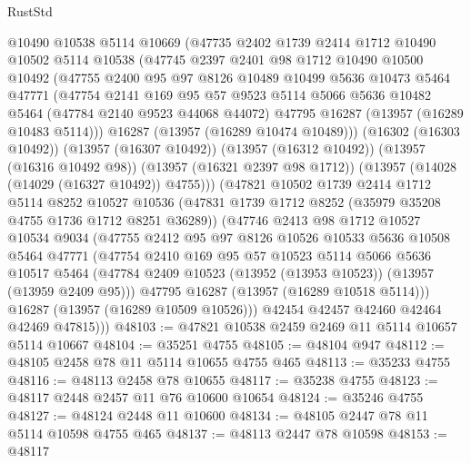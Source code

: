 \begin{lexlean}{RustStd}
\begin{coremodule}
    @10490
    @10538
    @5114
    @10669
    (@47735
      @2402
      @1739
      @2414
      @1712
      @10490
      @10502
      @5114
      @10538
      (@47745
        @2397
        @2401
        @98
        @1712
        @10490
        @10500
        @10492
        (@47755
          @2400
          @95
          @97
          @8126
          @10489
          @10499
          @5636
          @10473
          @5464
          @47771
          (@47754
            @2141
            @169
            @95
            @57
            @9523
            @5114
            @5066
            @5636
            @10482
            @5464
            (@47784 @2140 @9523 @44068 @44072)
            @47795
            @16287
            (@13957 (@16289 @10483 @5114)))
          @16287
          (@13957 (@16289 @10474 @10489)))
        (@16302 (@16303 @10492))
        (@13957 (@16307 @10492))
        (@13957 (@16312 @10492))
        (@13957 (@16316 @10492 @98))
        (@13957 (@16321 @2397 @98 @1712))
        (@13957 (@14028 (@14029 (@16327 @10492)) @4755)))
      (@47821
        @10502
        @1739
        @2414
        @1712
        @5114
        @8252
        @10527
        @10536
        (@47831 @1739 @1712 @8252 (@35979 @35208 @4755 @1736 @1712 @8251 @36289))
        (@47746
          @2413
          @98
          @1712
          @10527
          @10534
          @9034
          (@47755
            @2412
            @95
            @97
            @8126
            @10526
            @10533
            @5636
            @10508
            @5464
            @47771
            (@47754
              @2410
              @169
              @95
              @57
              @10523
              @5114
              @5066
              @5636
              @10517
              @5464
              (@47784 @2409 @10523 (@13952 (@13953 @10523)) (@13957 (@13959 @2409 @95)))
              @47795
              @16287
              (@13957 (@16289 @10518 @5114)))
            @16287
            (@13957 (@16289 @10509 @10526)))
          @42454
          @42457
          @42460
          @42464
          @42469
          @47815)))
@48103 := @47821 @10538 @2459 @2469 @11 @5114 @10657 @5114 @10667
@48104 := @35251 @4755
@48105 := @48104 @947
@48112 := @48105 @2458 @78 @11 @5114 @10655 @4755 @465
@48113 := @35233 @4755
@48116 := @48113 @2458 @78 @10655
@48117 := @35238 @4755
@48123 := @48117 @2448 @2457 @11 @76 @10600 @10654
@48124 := @35246 @4755
@48127 := @48124 @2448 @11 @10600
@48134 := @48105 @2447 @78 @11 @5114 @10598 @4755 @465
@48137 := @48113 @2447 @78 @10598
@48153 := @48117

\end{coremodule}
\end{lexlean}
